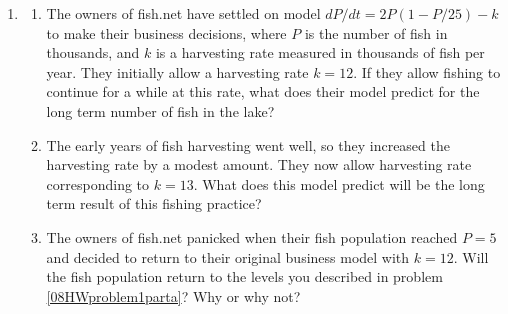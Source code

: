 \begin{enumerate}
\item
\begin{enumerate}
\item The owners of fish.net have settled on model $dP/dt = 2 P (1-P/25) - k$ to make their business decisions, where $P$ is the number of fish in thousands, and $k$ is a harvesting rate measured in thousands of fish per year. They initially allow a harvesting rate $k = 12$. If they allow fishing to continue for a while at this rate, what does their model predict for the long term number of fish in the lake? \label{08HWproblem1parta}
\item The early years of fish harvesting went well, so they increased the harvesting rate by a modest amount.  They now allow harvesting rate corresponding to $k = 13$.  What does this model predict will be the long term result of this fishing practice? \label{08HWproblem1partb}
\item The owners of fish.net panicked when their fish population reached $P=5$ and decided to return to their original business model with $k=12$.  Will the fish population return to the levels you described in problem \ref{08HWproblem1parta}?  Why or why not? \label{08HWproblem1partc}
\end{enumerate}


\end{enumerate}
